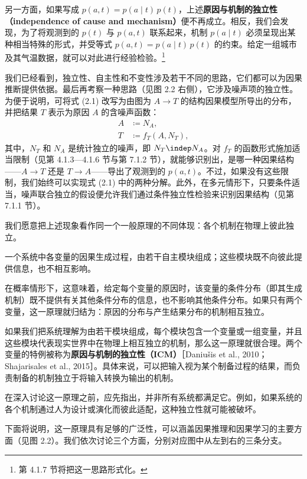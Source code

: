 另一方面，如果写成 $p(a,t)=p(a\mid t)\,p(t)$，上述\textbf{原因与机制的独立性（independence of cause and mechanism）}便不再成立。相反，我们会发现，为了将观测到的 $p(t)$ 与 $p(a,t)$ 联系起来，机制 $p(a\mid t)$ 必须呈现出某种相当特殊的形式，并受等式 $p(a,t)=p(a\mid t)\,p(t)$ 的约束。给定一组城市及其气温数据，就可以对此进行经验检验。\footnote{第 4.1.7 节将把这一思路形式化。}

我们已经看到，独立性、自主性和不变性涉及若干不同的思路，它们都可以为因果推断提供依据。最后再考察一种思路（见图 2.2 右侧），它涉及噪声项的独立性。为便于说明，可将式 (2.1) 改写为由图为 $A\to T$ 的结构因果模型所导出的分布，并把结果 $T$ 表示为原因 $A$ 的含噪声函数：
\[
 \begin{aligned}
 A&\coloneqq N_A,\\
 T&\coloneqq f_T(A,N_T),
 \end{aligned}
\]
其中，$N_T$ 和 $N_A$ 是统计独立的噪声，即 $N_T\indep N_A$。对 $f_T$ 的函数形式施加适当限制（见第 4.1.3—4.1.6 节与第 7.1.2 节），就能够识别出，是哪一种因果结构——$A\to T$ 还是 $T\to A$——导出了观测到的 $p(a,t)$。不过，如果没有这些限制，我们始终可以实现式 (2.1) 中的两种分解。此外，在多元情形下，只要条件适当，噪声联合独立的假设便允许我们通过条件独立性检验来识别因果结构（见第 7.1.1 节）。



我们愿意把上述现象看作同一个一般原理的不同体现：各个机制在物理上彼此独立。

\begin{principle}[独立机制]
一个系统中各变量的因果生成过程，由若干自主模块组成；这些模块既不向彼此提供信息，也不相互影响。

在概率情形下，这意味着，给定每个变量的原因时，该变量的条件分布（即其生成机制）既不提供有关其他条件分布的信息，也不影响其他条件分布。如果只有两个变量，这一原理就归结为：原因的分布与产生结果分布的机制相互独立。
\end{principle}

如果我们把系统理解为由若干模块组成，每个模块包含一个变量或一组变量，并且这些模块代表现实世界中在物理上相互独立的机制，那么这一原理就很合理。两个变量的特例被称为\textbf{原因与机制的独立性（ICM）}［Daniušis et al., 2010；Shajarisales et al., 2015］。具体来说，可以把输入视为某个制备过程的结果，而负责制备的机制独立于将输入转换为输出的机制。

在深入讨论这一原理之前，应先指出，并非所有系统都满足它。例如，如果系统的各个机制通过人为设计或演化而彼此适配，这种独立性就可能被破坏。

下面将说明，这一原理具有足够的广泛性，可以涵盖因果推理和因果学习的主要方面（见图 2.2）。我们依次讨论三个方面，分别对应图中从左到右的三条分支。

